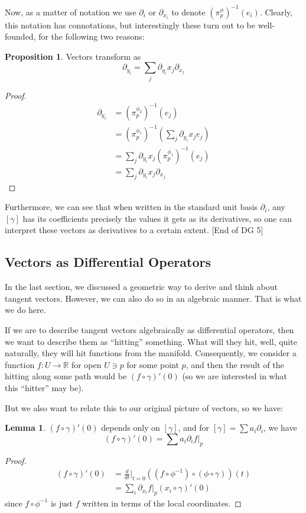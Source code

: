 \documentclass{article}
\theoremstyle{definition}
\newtheorem{proposition}{Proposition}
\newtheorem{lemma}{Lemma}
\begin{document}
Now, as a matter of notation we use $\partial_i$ or $\partial_{x_i}$ to denote
$(\pi^\phi_p)^{-1}(e_i)$. Clearly, this notation has connotations, but
interestingly these turn out to be well-founded, for the following two reasons:

\begin{proposition}
  Vectors transform as
  $$ \partial_{y_i} = \sum_j \partial_{y_i} x_j \partial_{x_j} $$
\end{proposition}
\begin{proof}
  \begin{align*}
    \partial_{y_i} &= (\pi^{\phi_2}_p)^{-1}(e_j) \\
    &= (\pi^{\phi_1}_p)^{-1} (\sum_j \partial_{y_i} x_j e_j) \\
    &= \sum_j \partial_{y_i} x_j (\pi^{\phi_1}_p)^{-1} (e_j) \\
    &= \sum_j \partial_{y_i} x_j \partial_{x_j}
  \end{align*}
\end{proof}

Furthermore, we can see that when written in the standard unit basis
$\partial_i$, any $[\gamma]$ has its coefficients precisely the values it gets
as its derivatives, so one can interpret these vectors as derivatives to a
certain extent. [End of DG 5]

\subsection{Vectors as Differential Operators}

In the last section, we discussed a geometric way to derive and think about
tangent vectors. However, we can also do so in an algebraic manner. That is what
we do here.

If we are to describe tangent vectors algebraically as differential operators,
then we want to describe them as ``hitting'' something. What will they hit,
well, quite naturally, they will hit functions from the manifold. Consequently,
we consider a function $f : U \to \mathbb{R}$ for open $U \ni p$ for some point
$p$, and then the result of the hitting along some path would be $(f \circ
\gamma)'(0)$ (so we are interested in what this ``hitter'' may be).

But we also want to relate this to our original picture of vectors, so we have:

\begin{lemma}
  $(f \circ \gamma)'(0)$ depends only on $[\gamma]$, and for $[\gamma] = \sum
  a_i \partial_i$, we have
  $$ (f \circ \gamma)'(0) = \sum a_i \partial_i f |_p $$
\end{lemma}
\begin{proof}
\begin{align*}
(f \circ \gamma)'(0) 
&= \frac{d}{dt} |_{t=0} ((f \circ \phi^{-1}) \circ (\phi \circ \gamma))(t) \\
&= \sum_i \partial_{x_i} f |_p (x_i \circ \gamma)'(0)
\end{align*}
since $f \circ \phi^{-1}$ is just $f$ written in terms of the local coordinates. 
\end{proof}
\end{document}
